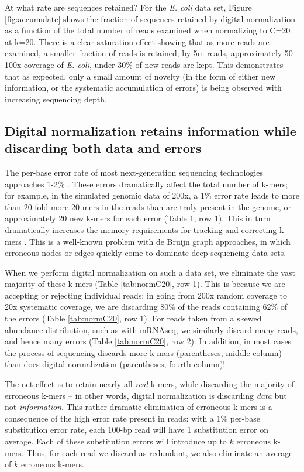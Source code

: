 \documentclass[10pt]{article}
\begin{document}
At what rate are sequences retained?  For the {\em E. coli} data set,
Figure \ref{fig:accumulate} shows the fraction of sequences retained
by digital normalization as a function of the total number of reads
examined when normalizing to C=20 at k=20.  There is a clear
saturation effect showing that as more reads are examined, a smaller
fraction of reads is retained; by 5m reads, approximately 50-100x
coverage of {\em E. coli}, under 30\% of new reads are kept.  This
demonstrates that as expected, only a small amount of novelty (in
the form of either new information, or the systematic accumulation of
errors) is being observed with increasing sequencing depth.


\subsection*{Digital normalization retains information while discarding
both data and errors}

The per-base error rate of most next-generation sequencing
technologies approaches 1-2\% \cite{pubmed19997069}.  These errors
dramatically affect the total number of k-mers; for example, in the
simulated genomic data of 200x, a 1\% error rate leads to more than
20-fold more 20-mers in the reads than are truly present in the
genome, or approximately 20 new k-mers for each error (Table 1, row
1).  This in turn dramatically increases the memory requirements for
tracking and correcting k-mers \cite{pubmed21245053}.  This is a
well-known problem with de Bruijn graph approaches, in which erroneous
nodes or edges quickly come to dominate deep sequencing data sets.

When we perform digital normalization on such a data set, we eliminate
the vast majority of these k-mers (Table \ref{tab:normC20}, row 1).
This is because we are accepting or rejecting individual reads; in
going from 200x random coverage to 20x systematic coverage, we are
discarding 80\% of the reads containing 62\% of the errors (Table
\ref{tab:normC20}, row 1).  For reads taken from a skewed abundance
distribution, such as with mRNAseq, we similarly discard many reads,
and hence many errors (Table \ref{tab:normC20}, row 2).  In addition,
in most cases the process of sequencing discards more k-mers
(parentheses, middle column) than does digital normalization (parentheses,
fourth column)!

The net effect is to retain nearly all {\em real} k-mers, while
discarding the majority of erroneous k-mers -- in other words, digital
normalization is discarding {\em data} but not {\em information}.
This rather dramatic elimination of erroneous k-mers is a consequence
of the high error rate present in reads: with a 1\% per-base
substitution error rate, each 100-bp read will have 1 substitution
error on average. Each of these substitution errors will introduce up
to $k$ erroneous k-mers.  Thus, for each read we discard as redundant,
we also eliminate an average of $k$ erroneous k-mers.
\end{document}
